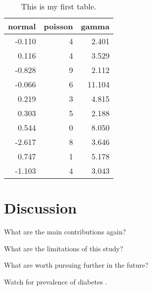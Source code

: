 \documentclass[12pt]{article}
\begin{document}
\begin{table}[tbp]
  \caption{This is my first table.}
  \label{tab:rv}
\centering
\begin{tabular}{rrr}
  \toprule
normal & poisson & gamma \\ 
  \midrule
-0.110 & 4 & 2.401 \\ 
  0.116 & 4 & 3.529 \\ 
  -0.828 & 9 & 2.112 \\ 
  -0.066 & 6 & 11.104 \\ 
  0.219 & 3 & 4.815 \\ 
  0.303 & 5 & 2.188 \\ 
  0.544 & 0 & 8.050 \\ 
  -2.617 & 8 & 3.646 \\ 
  0.747 & 1 & 5.178 \\ 
  -1.103 & 4 & 3.043 \\ 
   \bottomrule
\end{tabular}
\end{table}


\section{Discussion}
\label{sec:disc}

What are the main contributions again?

What are the limitations of this study?

What are worth pursuing further in the future?

\lipsum[1-2]
Watch for prevalence of diabetes \citep{wild2004global}.



\end{document}
